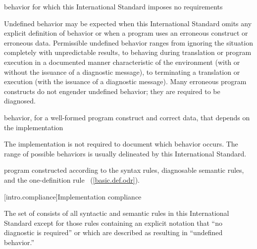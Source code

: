 %
behavior for which this International Standard
imposes no requirements\\
\begin{note} Undefined behavior may be expected when
this International Standard omits any explicit
definition of behavior or when a program uses an erroneous construct or erroneous data.
Permissible undefined behavior ranges
from ignoring the situation completely with unpredictable results, to
behaving during translation or program execution in a documented manner
characteristic of the environment (with or without the issuance of a
diagnostic message), to terminating a translation or execution (with the
issuance of a diagnostic message). Many erroneous program constructs do
not engender undefined behavior; they are required to be diagnosed.
\end{note}

%
behavior, for a well-formed program construct and correct data, that
depends on the implementation\\
\begin{note} The implementation is not required to
document which behavior occurs. The range of
possible behaviors is usually delineated by this International Standard.
\end{note}

%
\Cpp  program constructed according to the syntax rules, diagnosable
semantic rules, and the one-definition rule ~(\ref{basic.def.odr}).%

[intro.compliance]{Implementation compliance}

\pnum
{}%
%
The set of
consists of all syntactic and semantic rules in this International
Standard except for those rules containing an explicit notation that
``no diagnostic is required'' or which are described as resulting in
``undefined behavior.''


